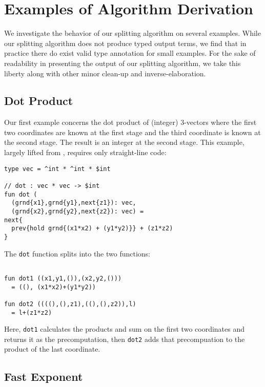  
\pagebreak

\section{Examples of Algorithm Derivation}
\label{sec:examples}

We investigate the behavior of our splitting algorithm on several examples.
While our splitting algorithm does not produce typed output terms,
we find that in practice there do exist valid type annotation for small examples.
For the sake of readability in presenting the output of our splitting algorithm,
we take this liberty along with other minor clean-up and inverse-elaboration.

\subsection{Dot Product}

Our first example concerns the dot product of (integer) 3-vectors where 
the first two coordinates are known at the first stage and the 
third coordinate is known at the second stage.
The result is an integer at the second stage.
This example, largely lifted from \cite{knoblock96}, requires only straight-line code:
\begin{lstlisting} 
type vec = ^int * ^int * $int

// dot : vec * vec -> $int
fun dot (
  (grnd{x1},grnd{y1},next{z1}): vec, 
  (grnd{x2},grnd{y2},next{z2}): vec) = 
next{
  prev{hold grnd{(x1*x2) + (y1*y2)}} + (z1*z2)
}
\end{lstlisting}
The \texttt{dot} function splits into the two functions:
\begin{lstlisting} 

fun dot1 ((x1,y1,()),(x2,y2,())) 
  = ((), (x1*x2)+(y1*y2))

fun dot2 ((((),(),z1),((),(),z2)),l) 
  = l+(z1*z2)
\end{lstlisting}
Here, \texttt{dot1} calculates the products and sum on the first two coordinates and returns it as the precomputation,
then \texttt{dot2} adds that precompuation to the product of the last coordinate.

\subsection{Fast Exponent}

